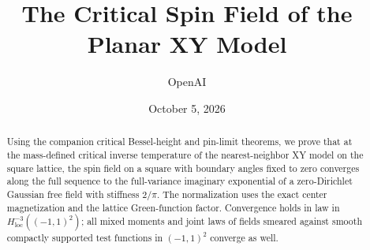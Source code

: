 \documentclass[11pt]{article}
\title{The Critical Spin Field of the Planar XY Model}
\author{OpenAI}
\date{October 5, 2026}
\numberwithin{equation}{section}
\theoremstyle{definition}
\theoremstyle{remark}
\begin{document}
\maketitle
\begin{abstract}
Using the companion critical Bessel-height and pin-limit theorems, we
prove that at the mass-defined critical inverse temperature of the
nearest-neighbor XY model on the square lattice, the spin field on a
square with boundary angles fixed to zero converges along the full
sequence to the full-variance imaginary exponential of a zero-Dirichlet
Gaussian free field with stiffness \(2/\pi\). The normalization uses
the exact center magnetization and the lattice Green-function factor.
Convergence holds in law in \(H^{-3}_{\mathrm{loc}}((-1,1)^2)\);
all mixed moments and joint laws of fields smeared against smooth
compactly supported test functions in \((-1,1)^2\) converge as well.
\end{abstract}
\tableofcontents








\end{document}
